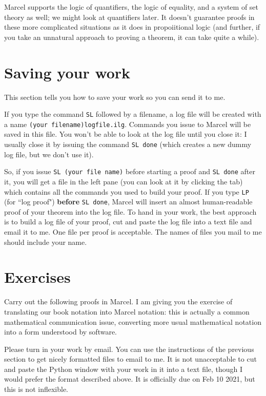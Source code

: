 \documentclass[12pt]{article}
\begin{document}
Marcel supports the logic of quantifiers, the logic of equality, and a system of set theory as well;  we might look at quantifiers later.  It doesn't guarantee proofs in these more complicated situations as it does in propoiitional logic (and further, if you take an unnatural approach to proving a theorem, it can take quite a while).

\section{Saving your work}

This section tells you how to save your work so you can send it to me.

If you type the command {\tt SL} followed by a filename, a log file will be created with a name {\tt (your filename)logfile.ilg}.  Commands you issue to Marcel will be saved in this file.
You won't be able to look at the log file until you close it:  I usually close it by issuing the command {\tt SL done} (which creates a new dummy log file, but we don't use it).

So, if you issue {\tt SL (your file name)} before starting a proof and {\tt SL done} after it, you will get a file in the left pane (you can look at it by clicking the tab) which contains all the commands you used to build your proof.  If you type {\tt LP} (for ``log proof") {\bf before} {\tt SL done}, Marcel will insert an almost human-readable proof of your theorem into the log file.
To hand in your work, the best approach is to build a log file of your proof, cut and paste the log file into a text file and email it to me.  One file per proof is acceptable.  The names of files you mail to me should include your name.

\section{Exercises}

Carry out the following proofs in Marcel.  I am giving you the exercise of translating our book notation into Marcel notation:  this is actually a common mathematical communication issue, converting more usual mathematical notation into a form understood by software.

Please turn in your work by email.  You can use the instructions of the previous section to get nicely formatted files to email to me.  It is not unacceptable to cut and paste the
Python window with your work in it into a text file, though I would prefer the format described above.  It is officially due on Feb 10 2021, but this is not inflexible.
\end{document}
